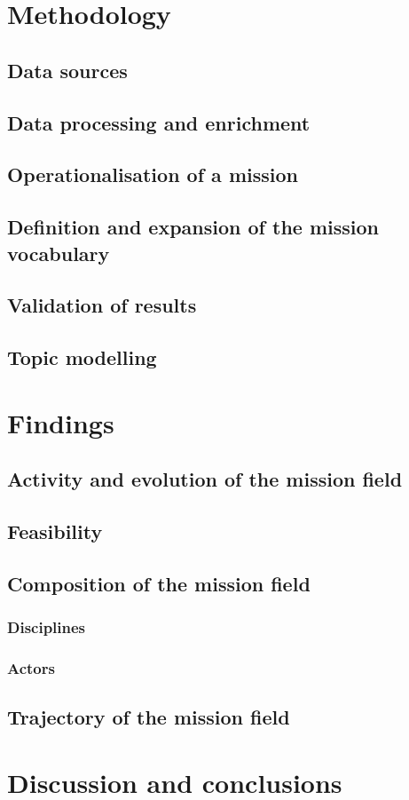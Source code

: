 \documentclass[11pt]{article}
\begin{document}
\section{Methodology}
\subsection{Data sources}
\subsection{Data processing and enrichment}
\subsection{Operationalisation of a mission}
\subsection{Definition and expansion of the mission vocabulary}
\subsection{Validation of results}
\subsection{Topic modelling}
\section{Findings}
\subsection{Activity and evolution of the mission field}
\subsection{Feasibility}
\subsection{Composition of the mission field}
\subsubsection{Disciplines}
\subsubsection{Actors}
\subsection{Trajectory of the mission field}
\section{Discussion and conclusions}




%
\end{document}
